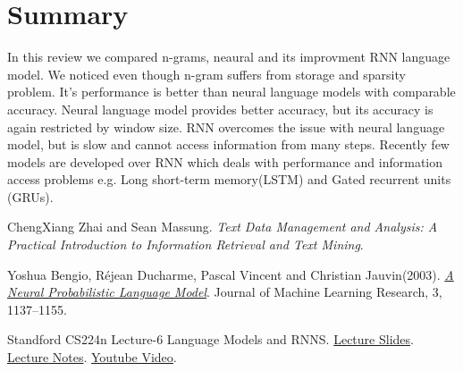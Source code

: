 \documentclass[letterpaper]{article}
\begin{document}
\section{Summary}
In this review we compared n-grams, neaural and its improvment RNN language model.
We noticed even though n-gram suffers from storage and sparsity problem. It's performance
is better than neural language models with comparable accuracy. Neural language model
provides better accuracy, but its accuracy is again restricted by window size. RNN overcomes
the issue with neural language model, but is slow and cannot access information from
many steps. Recently few models are developed over RNN which deals with performance and information
access problems e.g. Long short-term memory(LSTM) and Gated recurrent units (GRUs).

\begin{thebibliography}{9}
	ChengXiang Zhai and Sean Massung.
	\textit{Text Data Management and Analysis: A Practical Introduction to Information Retrieval and Text Mining}. 
	
	Yoshua Bengio, Réjean Ducharme, Pascal Vincent and Christian Jauvin(2003).
	\href{https://www.jmlr.org/papers/volume3/bengio03a/bengio03a.pdf}{\textit{A Neural Probabilistic Language Model}}.
	Journal of Machine Learning Research, 3, 1137–1155.
	
	Standford CS224n Lecture-6 Language Models and RNNS.
	\href{http://www.cs.umd.edu/class/fall2016/cmsc723/slides/slides_08.pdf}{Lecture Slides}.
	\href{http://web.stanford.edu/class/cs224n/readings/cs224n-2019-notes05-LM_RNN.pdf}{Lecture Notes}.
	\href{https://www.youtube.com/watch?v=iWea12EAu6U}{Youtube Video}.
\end{thebibliography}
\end{document}
